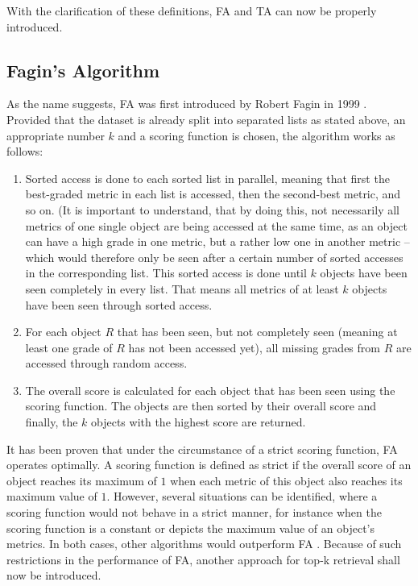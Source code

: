 With the clarification of these definitions, FA and TA can now be properly introduced.



\subsection{Fagin's Algorithm}

As the name suggests, FA was first introduced by Robert Fagin in 1999 \cite{fagin1999}. Provided that the dataset is already split into separated lists as stated above, an appropriate number $k$ and a scoring function is chosen, the algorithm works as follows:

\begin{enumerate}

\item Sorted access is done to each sorted list in parallel, meaning that first the best-graded metric in each list is accessed, then the second-best metric, and so on. (It is important to understand, that by doing this, not necessarily all metrics of one single object are being accessed at the same time, as an object can have a high grade in one metric, but a rather low one in another metric – which would therefore only be seen after a certain number of sorted accesses in the corresponding list. This sorted access is done until $k$ objects have been seen completely in every list. That means all metrics of at least $k$ objects have been seen through sorted access. 

\item For each object $R$ that has been seen, but not completely seen (meaning at least one grade of $R$ has not been accessed yet), all missing grades from $R$ are accessed through random access. 

\item The overall score is calculated for each object that has been seen using the scoring function. The objects are then sorted by their overall score and finally, the $k$ objects with the highest score are returned. 

\end{enumerate}

It has been proven that under the circumstance of a strict scoring function, FA operates optimally. A scoring function is defined as strict if the overall score of an object reaches its maximum of $1$ when each metric of this object also reaches its maximum value of $1$. However, several situations can be identified, where a scoring function would not behave in a strict manner, for instance when the scoring function is a constant or depicts the maximum value of an object's metrics. In both cases, other algorithms would outperform FA \cite{fagin2002}. Because of such restrictions in the performance of FA, another approach for top-k retrieval shall now be introduced.


